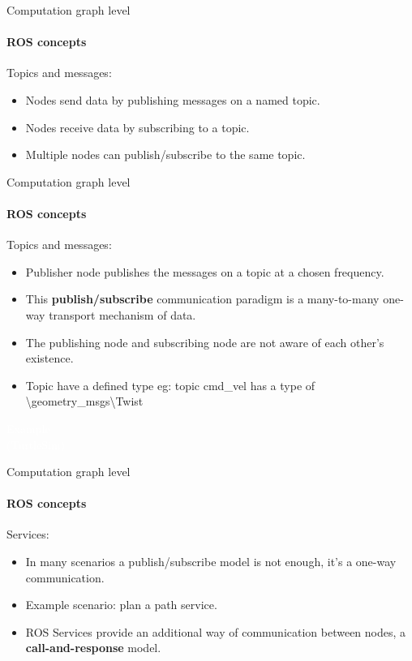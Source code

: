 \documentclass{beamer}
\begin{document}
\begin{frame}{Computation graph level}
    \framesubtitle{ROS concepts}
    {\huge Topics and messages:}
    \vspace{1cm}
    \begin{itemize}
        \item Nodes send data by publishing messages on a named topic.
        
        \item Nodes receive data by subscribing to a topic.
        
        \item Multiple nodes can publish/subscribe to the same topic.

    \end{itemize}
\end{frame}

\begin{frame}{Computation graph level}
    \framesubtitle{ROS concepts}
    {\huge Topics and messages:}
    \vspace{1cm}
    \begin{itemize}
        \item Publisher node publishes the messages on a topic at a chosen frequency.
        
        \item This \textbf{publish/subscribe} communication paradigm is a many-to-many one-way transport mechanism of data.
        
        \item The publishing node and subscribing node are not aware of each other's existence. 
        
        \item Topic have a defined type eg: topic cmd\_vel has a type of  \textbackslash geometry\_msgs\textbackslash Twist
    \end{itemize}\end{frame}

\begin{frame}[plain]{}  
    \centering
     {\huge \textcolor{white}{Example \\ (TurtleSim)} }
\end{frame}


\begin{frame}{Computation graph level}
    \framesubtitle{ROS concepts}
    {\huge Services:}
    \vspace{0.2cm}
    \begin{itemize}
        \item In many scenarios a publish/subscribe model is not enough, it’s a one-way
        communication.
        
        \item Example scenario: plan a path service.

        \item ROS Services provide an additional way of communication between nodes, a  \textbf{call-and-response} model.
    \end{itemize}  
\end{frame}
\end{document}
